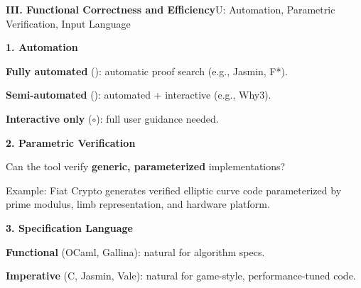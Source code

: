 \documentclass[10pt,aspectratio=1610,compress,dvipsnames]{beamer}
\begin{document}
\begin{frame}[fragile]{\bfseries III. Functional Correctness and Efficiency}{U: Automation, Parametric Verification, Input Language}
\begin{description}[style=nextline]
	\item[\textbf{Usability (U)}] \colorbox{-blue}{\textbf{1. Automation}}
	\item[$\to$] \textbf{Fully automated} (\textbullet): automatic proof search (e.g., Jasmin, F*).
	\item[$\to$] \textbf{Semi-automated} (\textopenbullet): automated + interactive (e.g., Why3).
	\item[$\to$] \textbf{Interactive only} ($\circ$): full user guidance needed.
	\item[]
	\item[] \colorbox{-blue}{\textbf{2. Parametric Verification}}
	\item[$\to$] Can the tool verify \textbf{generic, parameterized} implementations?
	\item[$\to$] Example: Fiat Crypto generates verified elliptic curve code parameterized by prime modulus, limb representation, and hardware platform.
	\item[]
	\item[] \colorbox{-blue}{\textbf{3. Specification Language}}
	\item[$\to$] \textbf{Functional} (OCaml, Gallina): natural for algorithm specs.
	\item[$\to$] \textbf{Imperative} (C, Jasmin, Vale): natural for game-style, performance-tuned code.
\end{description}
\end{frame}
\end{document}
